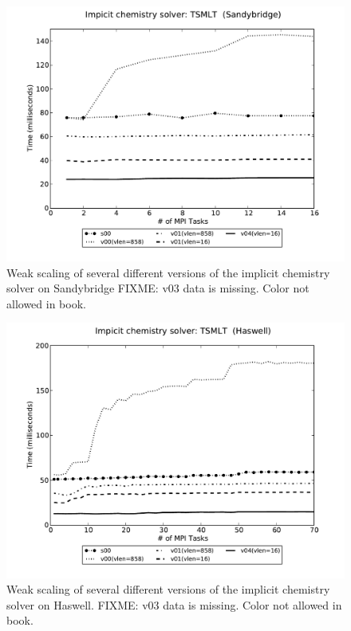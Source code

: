\begin{figure}[tbp]
 \begin{center}
\includegraphics[width=12.0cm]{figures/chem-snb.pdf}
\end{center}
\caption{Weak scaling of several different versions of the implicit chemistry solver on Sandybridge {\color{red} FIXME: v03 data is missing. Color not allowed in book.}}
\label{fig:chem-weak-snb}
\end{figure}

\begin{figure}[tbp]
 \begin{center}
\includegraphics[width=12.0cm]{figures/chem-hsw.pdf}
\end{center}
\caption{Weak scaling of several different versions of the implicit chemistry solver on Haswell. {\color{red} FIXME:  v03 data is missing. Color not allowed in book.}}
\label{fig:chem-weak-haswell}
\end{figure}


